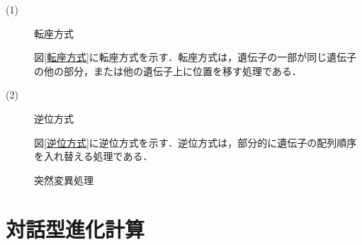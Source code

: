 \begin{description}

\item[ (1) ]転座方式

図\ref{転座方式}に転座方式を示す．転座方式は，遺伝子の一部が同じ遺伝子の他の部分，または他の遺伝子上に位置を移す処理である．

\item[ (2) ]逆位方式


図\ref{逆位方式}に逆位方式を示す．逆位方式は，部分的に遺伝子の配列順序を入れ替える処理である．


\end{description}

\begin{figure}[hbt]
\centering
{}




\caption{突然変異処理}
\label{fig:2.3}
\end{figure}


\newpage

\section{対話型進化計算}
\label{sec2.2}

